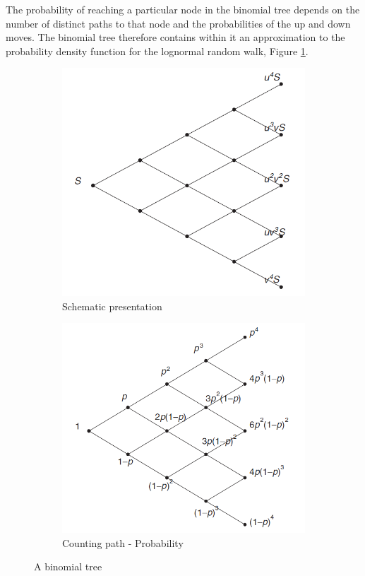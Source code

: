 The probability of reaching a particular node in the binomial tree depends on the number of distinct paths to that node and the probabilities of the up and down moves. The binomial tree therefore contains within it an approximation to the probability density function for the lognormal random walk, Figure \ref{fig:binomial_tree_general}.

\begin{figure}[H]
    \centering
    \begin{subfigure}[b]{0.4\textwidth}
        \includegraphics[width=\textwidth]{figure/binomial_schematic.png}
        \caption{Schematic presentation}
    \end{subfigure}
    \begin{subfigure}[b]{0.4\textwidth}
        \includegraphics[width=\textwidth]{figure/binomial_counting.png}
        \caption{Counting path - Probability}
    \end{subfigure}
    \caption{A binomial tree}
    \label{fig:binomial_tree_general}
\end{figure}



